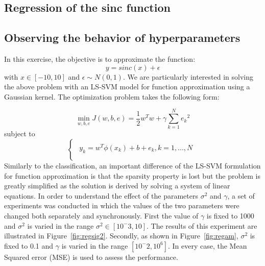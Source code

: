 \documentclass[conference,compsoc]{IEEEtran}
\begin{document}
%
%
%


\subsection{Regression of the sinc function}
\subsection{Observing the behavior of hyperparameters}
In this exercise, the objective is to approximate the function:
\begin{equation}
y = sinc (x) + \epsilon
\end{equation}
with $x \in [-10,10]$ and $\epsilon \sim N(0,1)$. We are particularly interested in solving the above problem with an LS-SVM model for function approximation using a Gaussian kernel. The optimization problem takes the following form:

\begin{equation}
\min\limits_{w,b,e} J(w,b,e) = \frac{1}{2}w^Tw + \gamma \sum_{k=1}^{N}{e_k}^2
\end{equation}
subject to
\begin{equation*}
\begin{cases}
\begin{aligned}
  y_k = w^T\phi(x_k)+b+e_k,  k=1,...,N \\

\end{aligned}
\end{cases}
\end{equation*}Similarly to the classification, an important difference of the LS-SVM formulation for function approximation is that the sparsity property is lost but the problem is greatly simplified as the solution is derived by solving a system of linear equations. In order to understand the effect of the parameters $\sigma^2$ and $\gamma$, a set of experiments was conducted in which the values of the two parameters were changed both separately and synchronously. First the value of $\gamma$ is fixed to 1000 and $\sigma^2$ is varied in the range $\sigma^2 \in [10^-3,10]$. The results of this experiment are illustrated in Figure~\ref{fig:regsig2}. Secondly, as shown in Figure~\ref{fig:regam}, $\sigma^2$ is fixed to 0.1 and $\gamma$ is varied in the range $[10^-2,10^6]$. In every case, the Mean Squared error (MSE) is used to assess the performance. 
\end{document}
